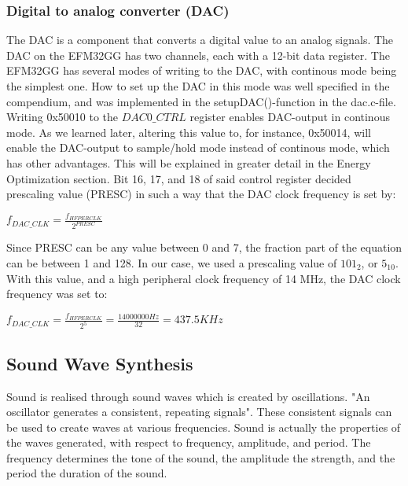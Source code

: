 \subsubsection{Digital to analog converter (DAC)}
The DAC is a component that converts a digital value to an analog signals. The DAC on the EFM32GG has two channels, each with a 12-bit data register. The EFM32GG has several modes of writing to the DAC, with continous mode being the simplest one. How to set up the DAC in this mode was well specified in the compendium, and was implemented in the setupDAC()-function in the dac.c-file. Writing 0x50010 to the $DAC0\_CTRL$ register enables DAC-output in continous mode. As we learned later, altering  this value to, for instance, 0x50014, will enable the DAC-output to sample/hold mode instead of continous mode, which has other advantages. This will be explained in greater detail in the Energy Optimization section. 
	Bit 16, 17, and 18 of said control register decided prescaling value (PRESC) in such a way that the DAC clock frequency is set by:

\begin{center}

$f_{DAC\_CLK} = \frac{f_{HFPERCLK}}{2^{PRESC}}$

\end{center}

Since PRESC can be any value between 0 and 7, the fraction part of the equation can be between 1 and 128. In our case, we used a prescaling value of $101_2$, or $5_{10}$. With this value, and a high peripheral clock frequency of 14 MHz, the DAC clock frequency was set to:

\begin{center}

$f_{DAC\_CLK} = \frac{f_{HFPERCLK}}{2^{5}} = \frac{14000000 Hz}{32} = 437.5 KHz $

\end{center}

\subsection{Sound Wave Synthesis}

Sound is realised through sound waves which is created by oscillations. "An oscillator generates a consistent, repeating signals". These consistent signals can be used to create waves at various frequencies. Sound is actually the properties of the waves generated, with respect to frequency, amplitude, and period. The frequency determines the tone of the sound, the amplitude the strength, and the period the duration of the sound.

